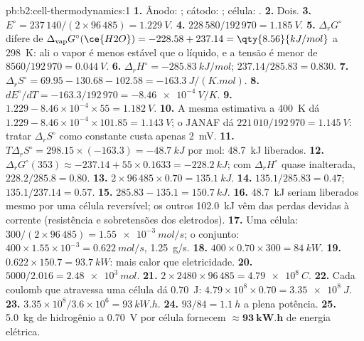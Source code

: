 \begin{solution}{pb:b2:cell-thermodynamics:1}
\textbf{1.} Ânodo: ; cátodo: ;
célula: .
\textbf{2.} Dois.
\textbf{3.} $E^\circ = 237\,140/(2 \times 96\,485) = \qty{1.229}{V}$.
\textbf{4.} $228\,580/192\,970 = \qty{1.185}{V}$.
\textbf{5.} $\Delta_r G^\circ$ difere de $\Delta_{\text{vap}}G^\circ(\ce{H2O}) = -228.58 + 237.14 =
\qty{8.56}{kJ/mol}$ a \qty{298}{K}: ali o vapor é menos estável que o líquido, e a
tensão é menor de $8560/192\,970 = \qty{0.044}{V}$.
\textbf{6.} $\Delta_r H^\circ = \qty{-285.83}{kJ/mol}$; $237.14/285.83 = 0.830$.
\textbf{7.} $\Delta_r S^\circ = 69.95 - 130.68 - 102.58 = \qty{-163.3}{J/(K.mol)}$.
\textbf{8.} $dE^\circ/dT = -163.3/192\,970 = \qty{-8.46e-4}{V/K}$.
\textbf{9.} $1.229 - 8.46 \times 10^{-4} \times 55 = \qty{1.182}{V}$.
\textbf{10.} A mesma estimativa a \qty{400}{K} dá $1.229 - 8.46 \times 10^{-4}
\times 101.85 = \qty{1.143}{V}$; o JANAF dá $221\,010/192\,970 = \qty{1.145}{V}$:
tratar $\Delta_r S^\circ$ como constante custa apenas \qty{2}{mV}.
\textbf{11.} $T\Delta_r S^\circ = 298.15 \times (-163.3) = \qty{-48.7}{kJ}$ por mol:
\qty{48.7}{kJ} liberados.
\textbf{12.} $\Delta_r G^\circ(353) \approx -237.14 + 55 \times 0.1633 =
\qty{-228.2}{kJ}$; com $\Delta_r H^\circ$ quase inalterada, $228.2/285.8 = 0.80$.
\textbf{13.} $2 \times 96\,485 \times 0.70 = \qty{135.1}{kJ}$.
\textbf{14.} $135.1/285.83 = 0.47$; $135.1/237.14 = 0.57$.
\textbf{15.} $285.83 - 135.1 = \qty{150.7}{kJ}$.
\textbf{16.} \qty{48.7}{kJ} seriam liberados mesmo por uma célula reversível; os
outros \qty{102.0}{kJ} vêm das perdas devidas à corrente (resistência e
sobretensões dos eletrodos).
\textbf{17.} Uma célula: $300/(2 \times 96\,485) = \qty{1.55e-3}{mol/s}$; o conjunto:
$400 \times 1.55 \times 10^{-3} = \qty{0.622}{mol/s}$, \qty{1.25}{g/s}.
\textbf{18.} $400 \times 0.70 \times 300 = \qty{84}{kW}$.
\textbf{19.} $0.622 \times 150.7 = \qty{93.7}{kW}$: mais calor que eletricidade.
\textbf{20.} $5000/2.016 = \qty{2.48e3}{mol}$.
\textbf{21.} $2 \times 2480 \times 96\,485 = \qty{4.79e8}{C}$.
\textbf{22.} Cada coulomb que atravessa uma célula dá \qty{0.70}{J}: $4.79 \times
10^8 \times 0.70 = \qty{3.35e8}{J}$.
\textbf{23.} $3.35 \times 10^8/3.6 \times 10^6 = \qty{93}{kW.h}$.
\textbf{24.} $93/84 = \qty{1.1}{h}$ a plena potência.
\textbf{25.} \qty{5.0}{kg} de hidrogênio a \qty{0.70}{V} por célula fornecem
$\boldsymbol{\approx \qty{93}{kW.h}}$ de energia elétrica.
\end{solution}
